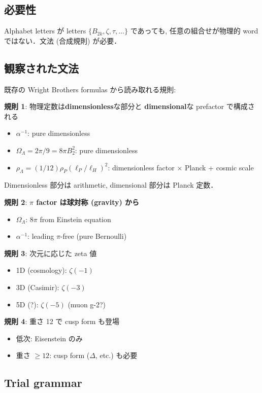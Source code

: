 \documentclass[11pt,a4paper]{article}
\begin{document}
\subsection{必要性}

Alphabet letters が letters $\{B_{2k}, \zeta, \tau, \ldots\}$ であっても,
任意の組合せが物理的 word ではない．文法 (合成規則) が必要．

\subsection{観察された文法}

既存の Wright Brothers formulas から読み取れる規則:

\textbf{規則 1}: 物理定数は\textbf{dimensionless}な部分と
\textbf{dimensional}な prefactor で構成される
\begin{itemize}
\item $\alpha^{-1}$: pure dimensionless
\item $\Omega_\Lambda = 2\pi/9 = 8\pi B_2^2$: pure dimensionless
\item $\rho_\Lambda = (1/12) \rho_P (\ell_P/\ell_H)^2$: dimensionless factor × Planck + cosmic scale
\end{itemize}

Dimensionless 部分は arithmetic, dimensional 部分は Planck 定数．

\textbf{規則 2}: \textbf{$\pi$ factor は球対称 (gravity) から}
\begin{itemize}
\item $\Omega_\Lambda$: $8\pi$ from Einstein equation
\item $\alpha^{-1}$: leading $\pi$-free (pure Bernoulli)
\end{itemize}

\textbf{規則 3}: 次元に応じた zeta 値
\begin{itemize}
\item 1D (cosmology): $\zeta(-1)$
\item 3D (Casimir): $\zeta(-3)$
\item 5D (?): $\zeta(-5)$ (muon g-2?)
\end{itemize}

\textbf{規則 4}: 重さ 12 で cusp form も登場
\begin{itemize}
\item 低次: Eisenstein のみ
\item 重さ $\geq 12$: cusp form ($\Delta$, etc.) も必要
\end{itemize}

\subsection{Trial grammar}
\end{document}
